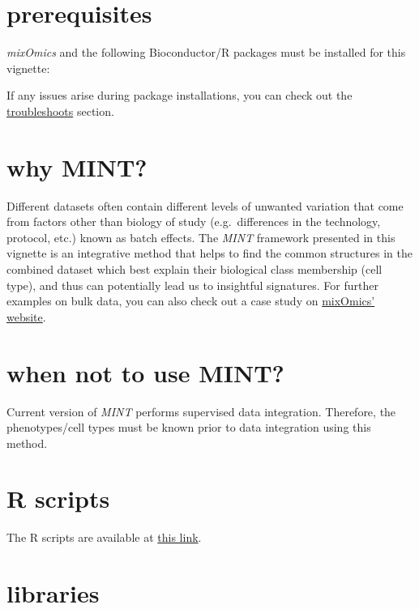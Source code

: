 \documentclass[]{book}
\theoremstyle{definition}
\theoremstyle{definition}
\theoremstyle{definition}
\theoremstyle{remark}
\begin{document}
\hypertarget{prerequisites}{%
\section{prerequisites}\label{prerequisites}}

\emph{mixOmics} \citep{R-mixOmics} and the following Bioconductor/R
packages must be installed for this vignette:

If any issues arise during package installations, you can check out the
\protect\hyperlink{troubleshoots}{troubleshoots} section.

\hypertarget{why-mint}{%
\section{why MINT?}\label{why-mint}}

Different datasets often contain different levels of unwanted variation
that come from factors other than biology of study (e.g.~differences in
the technology, protocol, etc.) known as batch effects. The \emph{MINT}
framework presented in this vignette is an integrative method that helps
to find the common structures in the combined dataset which best explain
their biological class membership (cell type), and thus can potentially
lead us to insightful signatures. For further examples on bulk data, you
can also check out a case study on
\href{http://mixomics.org/mixmint/stemcells-example/}{mixOmics'
website}.

\hypertarget{when-not-to-use-mint}{%
\section{when not to use MINT?}\label{when-not-to-use-mint}}

Current version of \emph{MINT} performs supervised data integration.
Therefore, the phenotypes/cell types must be known prior to data
integration using this method.

\hypertarget{r-scripts}{%
\section{R scripts}\label{r-scripts}}

The R scripts are available at
\href{https://github.com/AJABADI/MINT_sPLSDA/tree/master/Rscripts}{this
link}.

\hypertarget{libraries}{%
\section{libraries}\label{libraries}}
\end{document}
